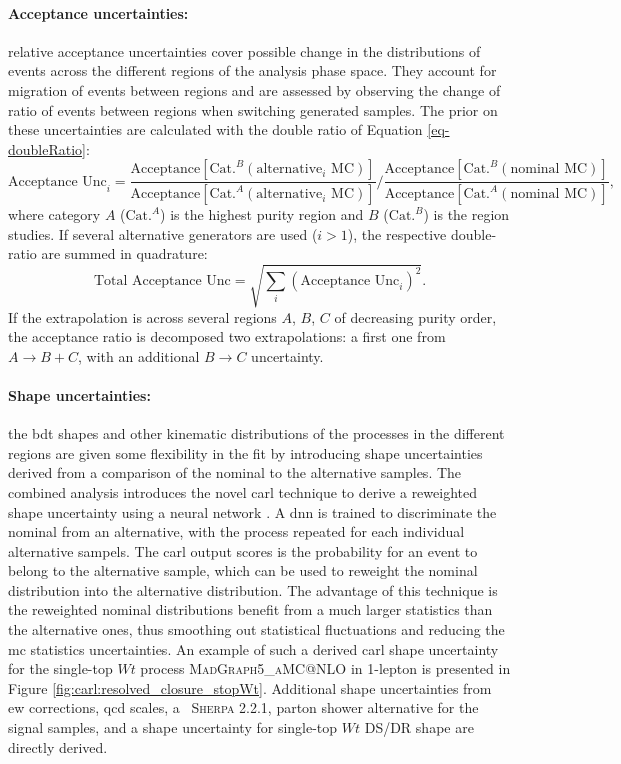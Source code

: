 \paragraph{Acceptance uncertainties:} relative acceptance uncertainties cover possible change in the distributions of events across the different regions of the analysis phase space. They account for migration of events between regions and are assessed by observing the change of ratio of events between regions when switching generated samples. The prior on these uncertainties are calculated with the double ratio of Equation \ref{eq-doubleRatio}:
\begin{equation}\label{eq-doubleRatio}
    \text{Acceptance Unc}_i = \frac{\text{Acceptance}[\text{Cat.}^B (\mathrm{alternative}_i\mathrm{\,\,MC})]}{\text{Acceptance}[\text{Cat.}^A (\mathrm{alternative}_i\mathrm{\,\,MC})]} \Bigg/ \frac{\text{Acceptance}[\text{Cat.}^B (\mathrm{nominal\,\,MC})]}{\text{Acceptance}[\text{Cat.}^A (\mathrm{nominal\,\,MC})]},
\end{equation}
where category $A$ ($\text{Cat.}^A$) is the highest purity region and $B$ ($\text{Cat.}^B$) is the region studies. If several alternative generators are used ($i > 1$), the respective double-ratio are summed in quadrature: \[ \text{Total Acceptance Unc} = \sqrt{\sum_i\left(\text{Acceptance Unc}_i\right)^2}.\] If the extrapolation is across several regions $A$, $B$, $C$ of decreasing purity order, the acceptance ratio is decomposed two extrapolations: a first one from $A \rightarrow B+C$, with an additional $B \rightarrow C$ uncertainty. 

\paragraph{Shape uncertainties:} the \gls{bdt} shapes and other kinematic distributions of the processes in the different regions are given some flexibility in the fit by introducing shape uncertainties derived from a comparison of the nominal to the alternative samples. The combined analysis introduces the novel \gls{carl} technique to derive a reweighted shape uncertainty using a neural network \cite{carl}. A \gls{dnn} is trained to discriminate the nominal from an alternative, with the process repeated for each individual alternative sampels. The \gls{carl} output scores is the probability for an event to belong to the alternative sample, which can be used to reweight the nominal distribution into the alternative distribution. The advantage of this technique is the reweighted nominal distributions benefit from a much larger statistics than the alternative ones, thus smoothing out statistical fluctuations and reducing the \gls{mc} statistics uncertainties. An example of such a derived \gls{carl} shape uncertainty for the single-top $Wt$ process \textsc{MadGraph5\_aMC@NLO} in 1-lepton is presented in Figure \ref{fig:carl:resolved_closure_stopWt}. Additional shape uncertainties from \gls{ew} corrections, \gls{qcd} scales, a \ptv\ \textsc{Sherpa} 2.2.1, parton shower alternative for the signal samples, and a shape uncertainty for single-top $Wt$ DS/DR shape are directly derived.

